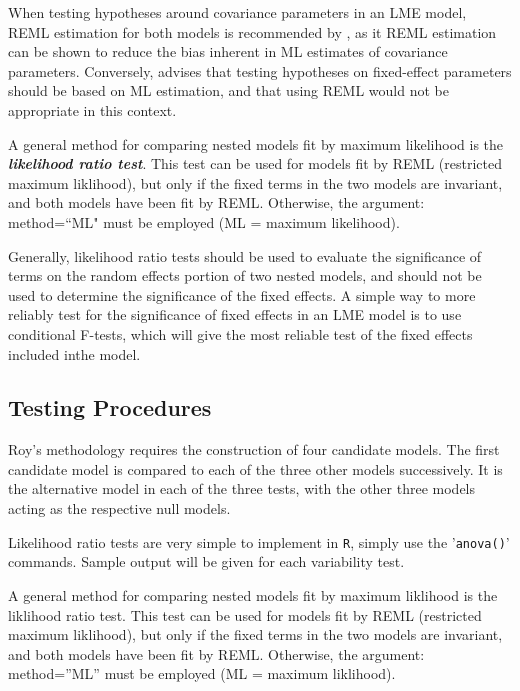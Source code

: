 \documentclass[MAIN.tex]{subfiles}
\begin{document}
When testing hypotheses around covariance parameters in an LME model, REML estimation for both models is recommended by \citep{west}, as it REML estimation can be shown to reduce the bias inherent in ML estimates of covariance parameters. Conversely, \citet{PB} advises that testing hypotheses on fixed-effect parameters should be based on ML estimation, and that using REML would not be appropriate in this context.

\bigskip
	
A general method for comparing nested models fit by maximum likelihood is the \textbf{\emph{likelihood ratio test}}. This test can be used for models fit by REML (restricted maximum liklihood), but only if the fixed terms in the two models are invariant, and both models have been fit by REML. Otherwise, the argument: method=``ML" must be employed (ML = maximum likelihood).
	
Generally, likelihood ratio tests should be used to evaluate the significance of terms on the random effects portion of two nested models, and should not be used to determine the significance of the fixed effects. 	A simple way to more reliably test for the significance of fixed effects in an LME model is to use conditional F-tests, which will give the most reliable test of the fixed effects included inthe  model.
	

\subsection{Testing Procedures}
Roy's methodology requires the construction of four candidate models. The first candidate model is compared to each of the three other models successively. It is the alternative model in each of the three tests, with the other three models acting as the respective null models.



Likelihood ratio tests are very simple to implement in \texttt{R}, simply use the '\texttt{anova()}' commands. Sample output will be given for each variability test.




A general method for comparing nested models fit by maximum liklihood is the liklihood ratio 
test. This test can be used for models fit by REML (restricted maximum liklihood), but only if the 
fixed terms in the two models are invariant, and both models have been fit by REML. Otherwise, 
the argument: method=”ML” must be employed (ML = maximum liklihood). 
\end{document}
